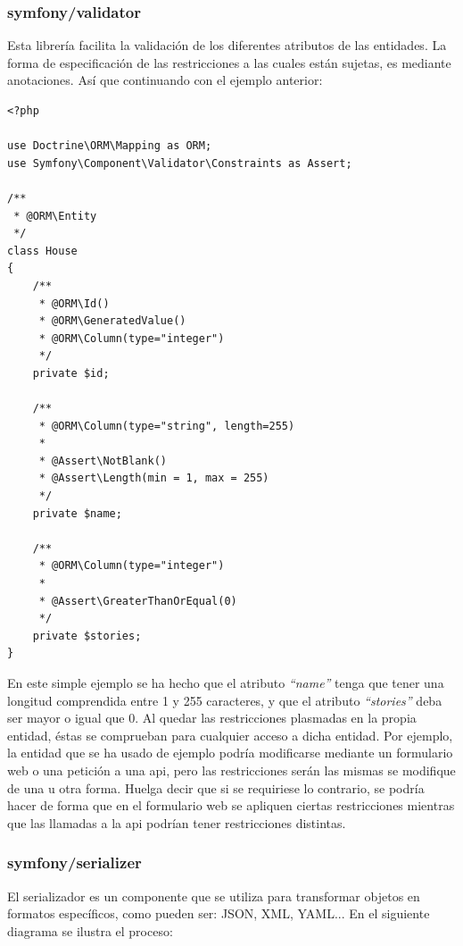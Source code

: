 \subsubsection{symfony/validator}
Esta librería facilita la validación de los diferentes atributos de las
entidades. La forma de especificación de las restricciones a las cuales están
sujetas, es mediante anotaciones. Así que continuando con el ejemplo anterior:

\begin{verbatim}
<?php

use Doctrine\ORM\Mapping as ORM;
use Symfony\Component\Validator\Constraints as Assert;

/**
 * @ORM\Entity
 */
class House
{
    /**
     * @ORM\Id()
     * @ORM\GeneratedValue()
     * @ORM\Column(type="integer")
     */
    private $id;

    /**
     * @ORM\Column(type="string", length=255)
     *
     * @Assert\NotBlank()
     * @Assert\Length(min = 1, max = 255)
     */
    private $name;

    /**
     * @ORM\Column(type="integer")
     *
     * @Assert\GreaterThanOrEqual(0)
     */
    private $stories;
}
\end{verbatim}

En este simple ejemplo se ha hecho que el atributo \textit{``name''} tenga que
tener una longitud comprendida entre 1 y 255 caracteres, y que el atributo
\textit{``stories''} deba ser mayor o igual que 0. Al quedar las restricciones
plasmadas en la propia entidad, éstas se comprueban para cualquier acceso a
dicha entidad. Por ejemplo, la entidad que se ha usado de ejemplo podría
modificarse mediante un formulario web o una petición a una \gls{api}, pero las
restricciones serán las mismas se modifique de una u otra forma. Huelga decir
que si se requiriese lo contrario, se podría hacer de forma que en el
formulario web se apliquen ciertas restricciones mientras que las llamadas a la
\gls{api} podrían tener restricciones distintas.

\subsubsection{symfony/serializer}
El serializador es un componente que se utiliza para transformar objetos en
formatos específicos, como pueden ser: JSON, XML,
YAML\cite{symfony_serializer}... En el siguiente diagrama se ilustra el
proceso:

